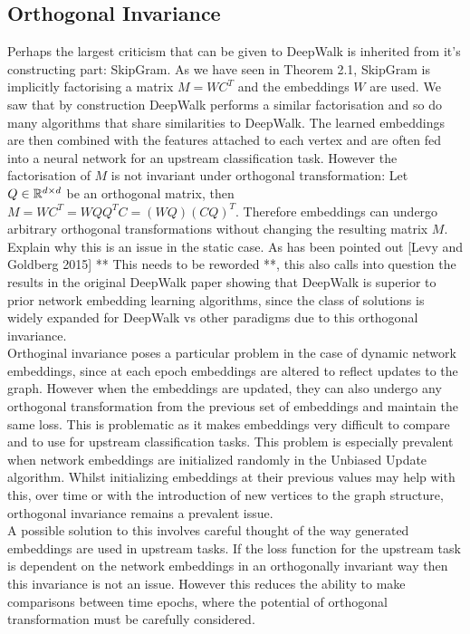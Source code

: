 \documentclass[a4paper]{article}
\begin{document}
\subsection{Orthogonal Invariance}
Perhaps the largest criticism that can be given to DeepWalk is inherited from it's constructing part: SkipGram. As we have
seen in Theorem 2.1, SkipGram is implicitly factorising a matrix $M = WC^T$ and the embeddings $W$ are used. We saw that
by construction DeepWalk performs a similar factorisation and so do many algorithms that share similarities to DeepWalk. The
learned embeddings are then combined with the features attached to each vertex and are often fed into a neural network for an
upstream classification task. However the factorisation of $M$ is not invariant under orthogonal transformation: Let $Q \in \R^{d \times d}$
be an orthogonal matrix, then $M = WC^T = WQQ^TC = (WQ)(CQ)^T$. Therefore embeddings can undergo arbitrary orthogonal transformations
without changing the resulting matrix $M$.\\
Explain why this is an issue in the static case. As has been pointed out [Levy and Goldberg 2015] ** This needs to be reworded **, this also calls into question the results in the original DeepWalk paper showing that DeepWalk is superior to prior network embedding learning algorithms, since the class of solutions is widely expanded for DeepWalk vs other paradigms due
to this orthogonal invariance.\\
Orthoginal invariance poses a particular problem in the case of dynamic network embeddings, since at each epoch embeddings are altered to reflect
updates to the graph. However when the embeddings are updated, they can also undergo any orthogonal transformation from the previous set of embeddings
and maintain the same loss. This is problematic as it makes embeddings very difficult to compare and to use for upstream classification tasks. This problem is especially
prevalent when network embeddings are initialized randomly in the Unbiased Update algorithm. Whilst initializing embeddings at their previous values may help with this,
over time or with the introduction of new vertices to the graph structure, orthogonal invariance remains a prevalent issue.\\
A possible solution to this involves careful thought of the way generated embeddings are used in upstream tasks. If the loss function for the upstream task
is dependent on the network embeddings in an orthogonally invariant way then this invariance is not an issue. However this reduces the ability to
make comparisons between time epochs, where the potential of orthogonal transformation must be carefully considered.\\
\end{document}
